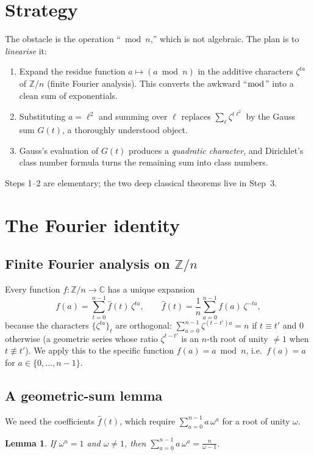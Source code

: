 \documentclass[11pt]{article}
\newtheorem{lemma}{Lemma}
\begin{document}
\section{Strategy}

The obstacle is the operation ``$\bmod n$,'' which is not algebraic. The plan is to \emph{linearise} it:
\begin{enumerate}
\item Expand the residue function $a\mapsto(a\bmod n)$ in the additive characters $\zeta^{ta}$ of $\mathbb{Z}/n$
      (finite Fourier analysis). This converts the awkward ``$\bmod$'' into a clean sum of exponentials.
\item Substituting $a=\ell^2$ and summing over $\ell$ replaces $\sum_\ell\zeta^{t\ell^2}$ by the Gauss sum $G(t)$,
      a thoroughly understood object.
\item Gauss's evaluation of $G(t)$ produces a \emph{quadratic character}, and Dirichlet's class number formula
      turns the remaining sum into class numbers.
\end{enumerate}
Steps 1--2 are elementary; the two deep classical theorems live in Step~3.

\section{The Fourier identity}

\subsection{Finite Fourier analysis on $\mathbb{Z}/n$}
Every function $f:\mathbb{Z}/n\to\mathbb{C}$ has a unique expansion
\[
f(a)=\sum_{t=0}^{n-1}\hat f(t)\,\zeta^{ta},\qquad \hat f(t)=\frac1n\sum_{a=0}^{n-1}f(a)\,\zeta^{-ta},
\]
because the characters $\{\zeta^{ta}\}_{t}$ are orthogonal:
$\sum_{a=0}^{n-1}\zeta^{(t-t')a}=n$ if $t\equiv t'$ and $0$ otherwise (a geometric series whose ratio
$\zeta^{t-t'}$ is an $n$-th root of unity $\ne1$ when $t\not\equiv t'$). We apply this to the specific function
$f(a)=a\bmod n$, i.e.\ $f(a)=a$ for $a\in\{0,\dots,n-1\}$.

\subsection{A geometric-sum lemma}
We need the coefficients $\hat f(t)$, which require $\sum_{a=0}^{n-1}a\,\omega^a$ for a root of unity $\omega$.

\begin{lemma}\label{lem:geo}
If $\omega^n=1$ and $\omega\ne1$, then $\displaystyle\sum_{a=0}^{n-1}a\,\omega^{a}=\frac{n}{\omega-1}$.
\end{lemma}
\end{document}
